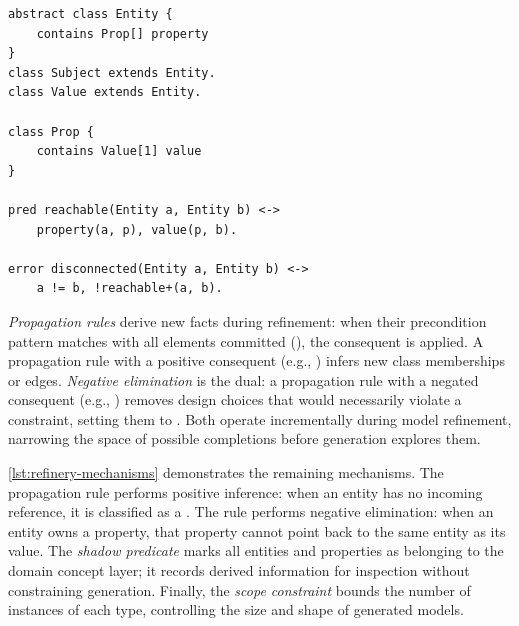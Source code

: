 \begin{lstlisting}[style=refinery, caption={Metamodel fragment with error predicate}, label=lst:refinery-metamodel]
abstract class Entity {
    contains Prop[] property
}
class Subject extends Entity.
class Value extends Entity.

class Prop {
    contains Value[1] value
}

pred reachable(Entity a, Entity b) <->
    property(a, p), value(p, b).

error disconnected(Entity a, Entity b) <->
    a != b, !reachable+(a, b).
\end{lstlisting}

\emph{Propagation rules} derive new facts during refinement: when their precondition pattern matches with all elements committed (), the consequent is applied. A propagation rule with a positive consequent (e.g., ) infers new class memberships or edges. \emph{Negative elimination} is the dual: a propagation rule with a negated consequent (e.g., ) removes design choices that would necessarily violate a constraint, setting them to . Both operate incrementally during model refinement, narrowing the space of possible completions before generation explores them.


\autoref{lst:refinery-mechanisms} demonstrates the remaining mechanisms. The propagation rule  performs positive inference: when an entity has no incoming  reference, it is classified as a . The rule  performs negative elimination: when an entity owns a property, that property cannot point back to the same entity as its value. The \emph{shadow predicate}  marks all entities and properties as belonging to the domain concept layer; it records derived information for inspection without constraining generation. Finally, the \emph{scope constraint} bounds the number of instances of each type, controlling the size and shape of generated models.

